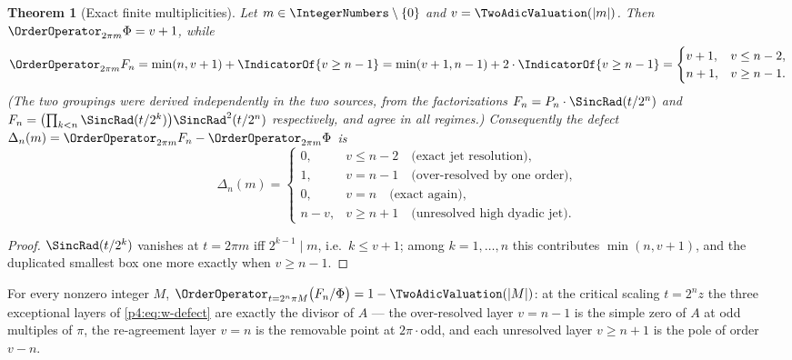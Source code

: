 \documentclass[11pt,oneside]{article}
\numberwithin{equation}{section}
\newtheorem{theorem}{Theorem}[section]
\theoremstyle{definition}
\theoremstyle{remark}
\begin{document}
\begin{theorem}[Exact finite multiplicities]
\label{p4:thm:w-filtration}
Let $m\in\IntegerNumbers\setminus\{0\}$ and $v=\TwoAdicValuation(|m|)$.  Then
$\OrderOperator_{2\pi m}\Phi=v+1$, while
\begin{equation}
 \OrderOperator_{2\pi m}F_n
 =\min(n,v+1)+\IndicatorOf{v\ge n-1}
 =\min(v+1,n-1)+2\cdot\IndicatorOf{v\ge n-1}
 =\begin{cases}
 v+1,&v\le n-2,\\
 n+1,&v\ge n-1.
 \end{cases}
 \label{p4:eq:w-finite-order}
\end{equation}
(The two groupings were derived independently in the two sources, from the
factorizations $F_n=P_n\cdot\SincRad(t/2^n)$ and
$F_n=\bigl(\prod_{k<n}\SincRad(t/2^k)\bigr)\SincRad^2(t/2^n)$ respectively, and
agree in all regimes.)
Consequently the defect
$\Delta_n(m)=\OrderOperator_{2\pi m}F_n-\OrderOperator_{2\pi m}\Phi$ is
\begin{equation}
 \Delta_n(m)=
 \begin{cases}
 0,&v\le n-2 \quad\text{(exact jet resolution)},\\
 1,&v=n-1 \quad\text{(over-resolved by one order)},\\
 0,&v=n \quad\text{(exact again)},\\
 n-v,&v\ge n+1 \quad\text{(unresolved high dyadic jet)}.
 \end{cases}
 \label{p4:eq:w-defect}
\end{equation}
\end{theorem}

\begin{proof}
$\SincRad(t/2^k)$ vanishes at $t=2\pi m$ iff $2^{k-1}\mid m$, i.e.\
$k\le v+1$; among $k=1,\dots,n$ this contributes $\min(n,v+1)$, and the
duplicated smallest box one more exactly when $v\ge n-1$.
\end{proof}

\begin{corollary}
\label{p4:cor:w-realization}
For every nonzero integer $M$,
$\OrderOperator_{t=2^n\pi M}\bigl(F_n/\Phi\bigr)=1-\TwoAdicValuation(|M|)$: at the critical
scaling $t=2^nz$ the three exceptional layers of \eqref{p4:eq:w-defect} are
exactly the divisor of $A$ --- the over-resolved layer $v=n-1$ is the simple
zero of $A$ at odd multiples of $\pi$, the re-agreement layer $v=n$ is the
removable point at $2\pi\cdot$odd, and each unresolved layer $v\ge n+1$ is
the pole of order $v-n$.
\end{corollary}
\end{document}
